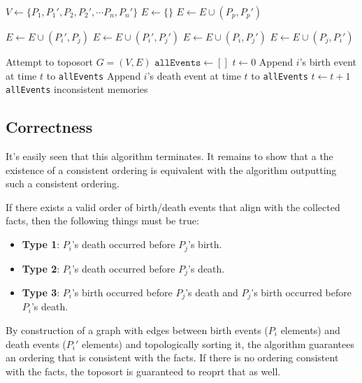 \documentclass[12pt]{article}
\begin{document}
\begin{algorithmic}[1]
    \State $V \gets \{P_1, P_1', P_2, P_2', \cdots P_n, P_n'\}$
    \State $E \gets \{\}$
        \State $E \gets E \cup (P_p, P_p')$
    \EndFor

    \item[]
            \State $E \gets E \cup (P_i', P_j)$
            \State $E \gets E \cup (P_i', P_j')$
            \State $E \gets E \cup (P_i, P_j')$
            \State $E \gets E \cup (P_j, P_i')$
        \EndIf
    \EndFor

    \item[]
    \State Attempt to toposort $G = (V, E)$
        \State $\texttt{allEvents} \gets []$
        \State $t \gets 0$
                \State Append $i$'s birth event at time $t$ to \texttt{allEvents}
                \State Append $i$'s death event at time $t$ to \texttt{allEvents}
            \EndIf
            \State $t \gets t + 1$
        \EndFor
        \State \Return \texttt{allEvents}
    \Else
        \State \Return inconsistent memories
    \EndIf
\end{algorithmic}

\pagebreak

\subsection{Correctness}

It's easily seen that this algorithm terminates.
It remains to show that a the existence of a consistent ordering
is equivalent with the algorithm outputting such a consistent ordering.

If there exists a valid order of birth/death events that align
with the collected facts, then the following things must be true:
\begin{itemize}
    \item \textbf{Type 1}: $P_i$'s death occurred before $P_j$'s birth.
    \item \textbf{Type 2}: $P_i$'s death occurred before $P_j$'s death.
    \item \textbf{Type 3}: $P_i$'s birth occurred before $P_j$'s death
          and $P_j$'s birth occurred before $P_i$'s death.
\end{itemize}
By construction of a graph with edges between birth events ($P_i$ elements)
and death events ($P_i'$ elements) and topologically sorting it,
the algorithm guarantees an ordering that is consistent with the facts.
If there is no ordering consistent with the facts, the toposort
is guaranteed to reoprt that as well.
\end{document}
